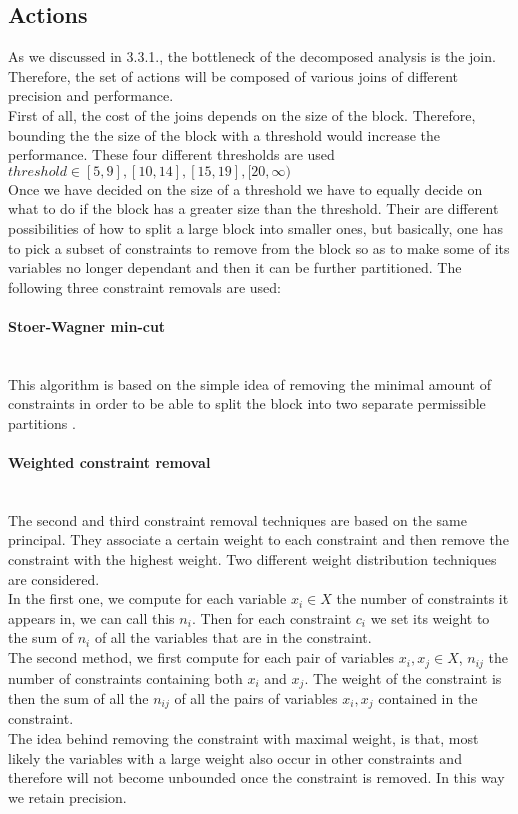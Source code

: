 \subsection{Actions}
As we discussed in 3.3.1., the bottleneck of the decomposed analysis is the join. Therefore, the set of actions will be composed of various joins of different precision and performance.\\
First of all, the cost of the joins depends on the size of the block. Therefore, bounding the the size of the block with a threshold would increase the performance. These four different thresholds are used $threshold \in [5,9],[10,14],[15,19],[20,\infty)$\\
Once we have decided on the size of a threshold we have to equally decide on what to do if the block has a greater size than the threshold. Their are different possibilities of how to split a large block into smaller ones, but basically, one has to pick a subset of constraints to remove from the block so as to make some of its variables no longer dependant and then it can be further partitioned. The following three constraint removals are used:
\paragraph{Stoer-Wagner min-cut}\mbox{}\\
This algorithm is based on the simple idea of removing the minimal amount of constraints in order to be able to split the block into two separate permissible partitions \cite{stoer1997simple}.
\paragraph{Weighted constraint removal}\mbox{}\\
The second and third constraint removal techniques are based on the same principal. They associate a certain weight to each constraint and then remove the constraint with the highest weight. Two different weight distribution techniques are considered. \\
In the first one, we compute for each variable $x_i \in X$ the number of constraints it appears in, we can call this $n_i$. Then for each constraint $c_i$ we set its weight to the sum of $n_i$ of all the variables that are in the constraint.\\
The second method, we first compute for each pair of variables $x_i,x_j\in X$, $n_{ij}$ the number of constraints containing both $x_i$ and $x_j$. The weight of the constraint is then the sum of all the $n_{ij}$ of all the pairs of variables $x_i,x_j$ contained in the constraint.\\
The idea behind removing the constraint with maximal weight, is that, most likely the variables with a large weight also occur in other constraints and therefore will not become unbounded once the constraint is removed. In this way we retain precision.
